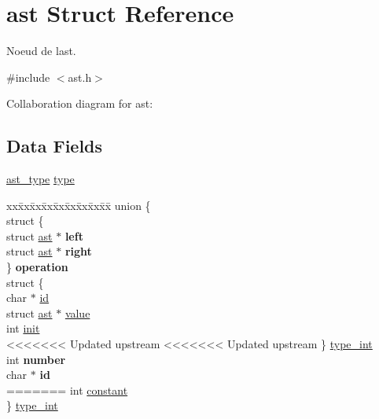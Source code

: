 \hypertarget{structast}{}\section{ast Struct Reference}
\label{structast}


Noeud de l\textquotesingle{}ast.  




{\ttfamily \#include $<$ast.\+h$>$}



Collaboration diagram for ast\+:
\subsection*{Data Fields}
\begin{DoxyCompactItemize}
\item 
\hyperlink{ast_8h_a77091c187ac9a89404fac2e8226daef3}{ast\+\_\+type} \hyperlink{structast_a8321fc8e556a418583dd74ee9fcc2bf7}{type}
\item 
\mbox{\label{structast_aa607c7a27d555cb2310d47623165269a}} 
\begin{tabbing}
xx\=xx\=xx\=xx\=xx\=xx\=xx\=xx\=xx\=\kill
union \{\\
\>struct \{\\
\>\>struct \hyperlink{structast}{ast} $\ast$ {\bfseries left}\\
\>\>struct \hyperlink{structast}{ast} $\ast$ {\bfseries right}\\
\>\} {\bfseries operation}\\
\>struct \{\\
\>\>char $\ast$ \hyperlink{structast_aecb3b0d045ada529257a2fbf8f829599}{id}\\
\>\>struct \hyperlink{structast}{ast} $\ast$ \hyperlink{structast_a0547e48c9f9ecb35c94f988890f217b7}{value}\\
\>\>int \hyperlink{structast_a795ea50921b36311ffd5e7baa2ef1f7e}{init}\\
<<<<<<< Updated upstream
<<<<<<< Updated upstream
\>\} \hyperlink{structast_a48c1fea64ccd73c68d3901c23d65f9f5}{type\_int}\\
\>int {\bfseries number}\\
\>char $\ast$ {\bfseries id}\\
=======
\>\>int \hyperlink{structast_ac347bb44c6dc857729453831c5714f84}{constant}\\
\>\} \hyperlink{structast_a48c1fea64ccd73c68d3901c23d65f9f5}{type\_int}\\

\end{tabbing}
\end{DoxyCompactItemize}
